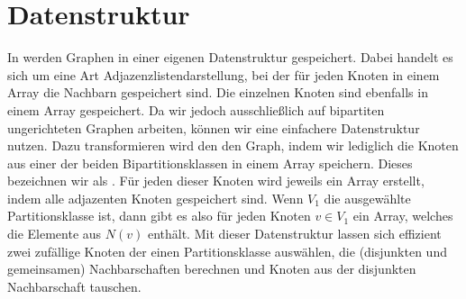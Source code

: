 \section{Datenstruktur}
\label{sec:datenstruktur}
In \nk werden Graphen in einer eigenen Datenstruktur gespeichert.
Dabei handelt es sich um eine Art Adjazenzlistendarstellung, bei der für jeden Knoten 
in einem Array die Nachbarn gespeichert sind. Die einzelnen Knoten sind ebenfalls in
einem Array gespeichert. Da wir jedoch ausschließlich auf bipartiten ungerichteten Graphen
arbeiten, können wir eine einfachere Datenstruktur nutzen. Dazu transformieren wird den
den Graph, indem wir lediglich
die Knoten aus einer der beiden Bipartitionsklassen  
in einem Array speichern. Dieses bezeichnen wir als \red{\fett{\partvek}}.
Für jeden dieser Knoten wird jeweils ein Array erstellt, indem alle adjazenten Knoten gespeichert sind.
Wenn $V_{1}$ die ausgewählte Partitionsklasse ist, dann gibt es also für jeden Knoten $v\in V_{1}$
ein Array, welches die Elemente aus $N(v)$ enthält.
Mit dieser Datenstruktur lassen sich effizient zwei zufällige Knoten der einen Partitionsklasse
auswählen, die (disjunkten und gemeinsamen) Nachbarschaften berechnen und Knoten aus der
disjunkten Nachbarschaft tauschen.


